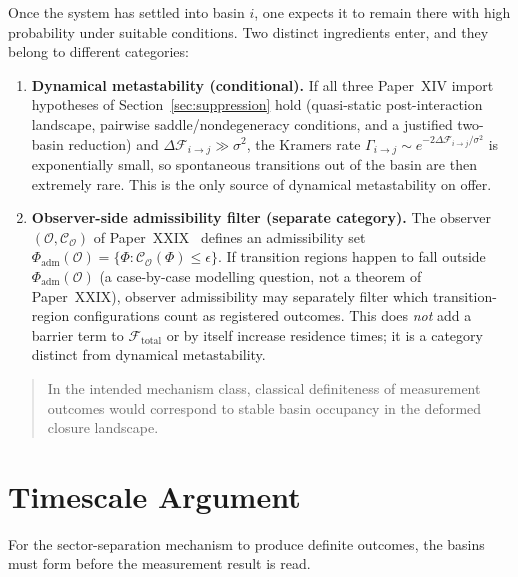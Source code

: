 \documentclass[12pt]{article}
\newcommand{\Fcal}{\mathcal{F}}
\newcommand{\Ocal}{\mathcal{O}}
\newcommand{\Ccal}{\mathcal{C}}
\begin{document}
Once the system has settled into basin $i$, one expects it to remain there with high probability under suitable conditions. Two distinct ingredients enter, and they belong to different categories:

\begin{enumerate}
    \item \textbf{Dynamical metastability (conditional).} If all three Paper~XIV import hypotheses of Section~\ref{sec:suppression} hold (quasi-static post-interaction landscape, pairwise saddle/nondegeneracy conditions, and a justified two-basin reduction) and $\Delta\Fcal_{i\to j} \gg \sigma^2$, the Kramers rate $\Gamma_{i \to j} \sim e^{-2\Delta\Fcal_{i\to j}/\sigma^2}$ is exponentially small, so spontaneous transitions out of the basin are then extremely rare. This is the only source of dynamical metastability on offer.

    \item \textbf{Observer-side admissibility filter (separate category).} The observer $(\Ocal, \Ccal_\Ocal)$ of Paper~XXIX~\citep{SmartXXIX} defines an admissibility set $\Phi_{\mathrm{adm}}(\Ocal) = \{\Phi : \Ccal_\Ocal(\Phi) \le \epsilon\}$. If transition regions happen to fall outside $\Phi_{\mathrm{adm}}(\Ocal)$ (a case-by-case modelling question, not a theorem of Paper~XXIX), observer admissibility may separately filter which transition-region configurations count as registered outcomes. This does \emph{not} add a barrier term to $\Fcal_{\mathrm{total}}$ or by itself increase residence times; it is a category distinct from dynamical metastability.
\end{enumerate}

\begin{quote}
In the intended mechanism class, classical definiteness of measurement outcomes would correspond to stable basin occupancy in the deformed closure landscape.
\end{quote}

\section{Timescale Argument}\label{sec:timescale}

For the sector-separation mechanism to produce definite outcomes, the basins must form before the measurement result is read.
\end{document}
